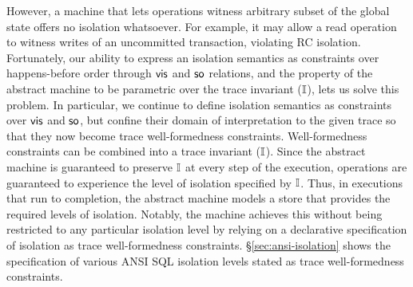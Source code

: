 However, a machine that lets operations witness arbitrary subset of
the global state offers no isolation whatsoever. For example, it may
allow a read operation to witness writes of an uncommitted
transaction, violating RC isolation. Fortunately, our ability to
express an isolation semantics as constraints over happens-before
order through $\textsf{vis}$ and $\textsf{so}$ relations, and the property of the
abstract machine to be parametric over the trace invariant ($\mathbb{I}$),
lets us solve this problem.  In particular, we continue to define
isolation semantics as constraints over $\textsf{vis}$ and $\textsf{so}$, but
confine their domain of interpretation to the given trace so that they
now become trace well-formedness constraints. Well-formedness
constraints can be combined into a trace invariant ($\mathbb{I}$). Since the
abstract machine is guaranteed to preserve $\mathbb{I}$ at every step of the
execution, operations are guaranteed to experience the level of
isolation specified by $\mathbb{I}$.  Thus, in executions that run to
completion, the abstract machine models a store that provides the
required levels of isolation. Notably, the machine achieves this
without being restricted to any particular isolation level by relying
on a declarative specification of isolation as trace well-formedness
constraints.  \S\ref{sec:ansi-isolation} shows the specification of
various ANSI SQL isolation levels stated as trace well-formedness
constraints.

